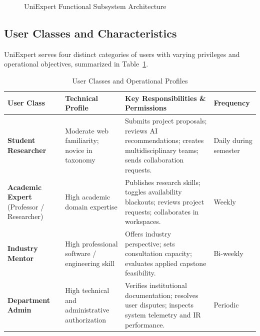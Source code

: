 \documentclass[11pt,a4paper]{article}
\begin{document}
\begin{figure}[H]
{%
}
\caption{UniExpert Functional Subsystem Architecture}
\label{fig:functional_tree}
\end{figure}

\subsection{User Classes and Characteristics}
UniExpert serves four distinct categories of users with varying privileges and operational objectives, summarized in Table~\ref{tab:user_classes}.

\begin{table}[H]
\centering
\small
\caption{User Classes and Operational Profiles}
\label{tab:user_classes}
\begin{tabularx}{\textwidth}{@{}p{3.2cm} p{2.8cm} X l@{}}
\toprule
\textbf{User Class} & \textbf{Technical Profile} & \textbf{Key Responsibilities \& Permissions} & \textbf{Frequency} \\
\midrule
\textbf{Student Researcher} & Moderate web familiarity; novice in taxonomy & Submits project proposals; reviews AI recommendations; creates multidisciplinary teams; sends collaboration requests. & Daily during semester \\
\addlinespace
\textbf{Academic Expert} (Professor / Researcher) & High academic domain expertise & Publishes research skills; toggles availability blackouts; reviews project requests; collaborates in workspaces. & Weekly \\
\addlinespace
\textbf{Industry Mentor} & High professional software / engineering skill & Offers industry perspective; sets consultation capacity; evaluates applied capstone feasibility. & Bi-weekly \\
\addlinespace
\textbf{Department Admin} & High technical and administrative authorization & Verifies institutional documentation; resolves user disputes; inspects system telemetry and IR performance. & Periodic \\
\bottomrule
\end{tabularx}
\end{table}
\end{document}
